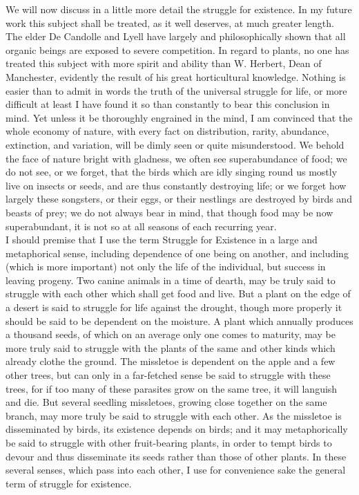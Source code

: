 \indent We will now discuss in a little more detail the struggle for existence. In my future work this subject shall be treated, as it well deserves, at much greater length. The elder De Candolle and Lyell have largely and philosophically shown that all organic beings are exposed to severe competition. In regard to plants, no one has treated this subject with more spirit and ability than W. Herbert, Dean of Manchester, evidently the result of his great horticultural knowledge. Nothing is easier than to admit in words the truth of the universal struggle for life, or more difficult at least I have found it so than constantly to bear this conclusion in mind. Yet unless it be thoroughly engrained in the mind, I am convinced that the whole economy of nature, with every fact on distribution, rarity, abundance, extinction, and variation, will be dimly seen or quite misunderstood. We behold the face of nature bright with gladness, we often see superabundance of food; we do not see, or we forget, that the birds which are idly singing round us mostly live on insects or seeds, and are thus constantly destroying life; or we forget how largely these songsters, or their eggs, or their nestlings are destroyed by birds and beasts of prey; we do not always bear in mind, that though food may be now superabundant, it is not so at all seasons of each recurring year.\\
\indent I should premise that I use the term Struggle for Existence in a large and metaphorical sense, including dependence of one being on another, and including (which is more important) not only the life of the individual, but success in leaving progeny. Two canine animals in a time of dearth, may be truly said to struggle with each other which shall get food and live. But a plant on the edge of a desert is said to struggle for life against the drought, though more properly it should be said to be dependent on the moisture. A plant which annually produces a thousand seeds, of which on an average only one comes to maturity, may be more truly said to struggle with the plants of the same and other kinds which already clothe the ground. The missletoe is dependent on the apple and a few other trees, but can only in a far-fetched sense be said to struggle with these trees, for if too many of these parasites grow on the same tree, it will languish and die. But several seedling missletoes, growing close together on the same branch, may more truly be said to struggle with each other. As the missletoe is disseminated by birds, its existence depends on birds; and it may metaphorically be said to struggle with other fruit-bearing plants, in order to tempt birds to devour and thus disseminate its seeds rather than those of other plants. In these several senses, which pass into each other, I use for convenience sake the general term of struggle for existence.\\
